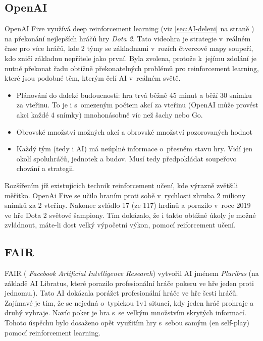 \documentclass[12pt]{report}			%
\newcommand{\doubleref}[1]{\ref{#1} na straně \pageref{#1}}
\begin{document}
	\subsection{OpenAI}
	\label{sec:OpenAI}
	OpenAI Five využívá deep reinforcement learning (\gls{viz} \doubleref{sec:AI-deleni}) na překonání nejlepších hráčů hry \emph{Dota 2}. Tato videohra je strategie v~reálném čase pro více hráčů, kde 2 týmy se základnami v~rozích čtvercové mapy soupeří, kdo zničí základnu nepřítele jako první. Byla zvolena, protože k~jejímu zdolání je nutné překonat řadu obtížně překonatelných problémů pro reinforcement learning, které jsou podobné těm, kterým čelí \gls{AI} v~reálném světě.
	\begin{itemize}
	\item Plánování do daleké budoucnosti: hra trvá běžně 45 minut a běží 30 snímku za vteřinu. To je i s~omezeným počtem akcí za vteřinu (OpenAI může provést akci každé 4 snímky) mnohonásobně víc než šachy nebo Go.
	\item Obrovské množství možných akcí a obrovské množství pozorovaných hodnot
	\item Každý tým (tedy i \gls{AI}) má neúplné informace o~přesném stavu hry. Vidí jen okolí spoluhráčů, jednotek a budov. Musí tedy předpokládat soupeřovo chování a strategii.
	\end{itemize}
	Rozšířením jíž existujících technik reinforcement učení, kde výrazně zvětšili měřítko. OpenAi Five se učilo hraním proti sobě v~rychlosti  zhruba 2 miliony snímků za 2 vteřiny. Nakonec zvládlo 17 (ze 117) hrdinů a porazilo v~roce 2019 ve hře  Dota 2 světové šampiony. Tím dokázalo, že i takto obtížné úkoly je možné zvládnout, máte-li dost velký výpočetní výkon, pomocí reiforcement učení. \parencite{openai2019dota}
	\subsection{FAIR}
	\label{sec:FAIR}
	FAIR ( \emph{Facebook Artificial Intelligence Research}) vytvořil \gls{AI} jménem \emph{Pluribus} (na základě \gls{AI} Libratus, které porazilo profesionální hráče pokeru ve hře jeden proti jednomu.). Tato \gls{AI} dokázala porážet profesionální hráče ve hře šesti hráčů. Zajímavé je tím, že se nejedná o~typickou 1v1 situaci, kdy jeden hráč prohraje a druhý vyhraje. Navíc poker je hra s~se velkým množstvím skrytých informací. Tohoto úspěchu bylo dosaženo opět využitím hry s~sebou samým (\gls{en} self-play) pomocí reinforcement learning. \parencite{FAIR-poker}\\	
		
\end{document}

